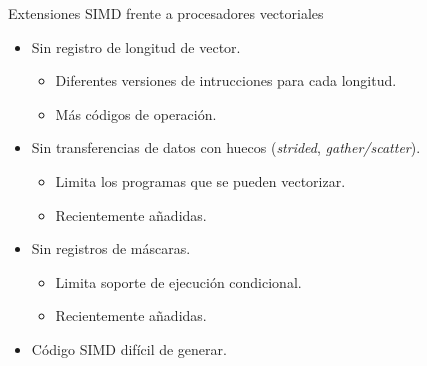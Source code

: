 \begin{frame}[t]{Extensiones SIMD frente a procesadores vectoriales}
\begin{itemize}

  \item Sin registro de longitud de vector.
    \begin{itemize}
      \item Diferentes versiones de intrucciones para cada longitud.
      \item Más códigos de operación.
    \end{itemize}

  \item Sin transferencias de datos con huecos (\emph{strided}, \emph{gather/scatter}).
    \begin{itemize}
      \item Limita los programas que se pueden vectorizar.
      \item Recientemente añadidas.
    \end{itemize}

  \item Sin registros de máscaras.
    \begin{itemize}
      \item Limita soporte de ejecución condicional.
      \item Recientemente añadidas.
    \end{itemize}

  \item Código SIMD difícil de generar.
\end{itemize}
\end{frame}


